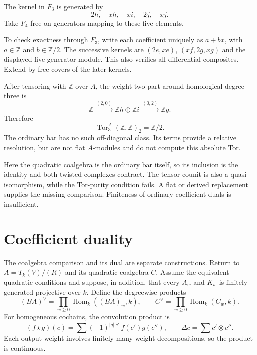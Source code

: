 The kernel in $F_3$ is generated by
\[
 2h,\quad xh,\quad xi,\quad2j,\quad xj.
\]
Take $F_4$ free on generators mapping to these five elements.

To check exactness through $F_3$, write each coefficient uniquely as $a+bx$, with $a\in\mathbb Z$ and $b\in\mathbb Z/2$.
The successive kernels are $(2e,xe)$, $(xf,2g,xg)$ and the displayed five-generator module.
This also verifies all differential composites.
Extend by free covers of the later kernels.

After tensoring with $\mathbb Z$ over $A$, the weight-two part around homological degree three is
\[
 \mathbb Z\xrightarrow{\ (2,0)\ }
 \mathbb Zh\oplus\mathbb Zi
 \xrightarrow{\ (0,2)\ }\mathbb Zg.
\]
Therefore
\[
 \operatorname{Tor}^A_3(\mathbb Z,\mathbb Z)_2=\mathbb Z/2.
\]
The ordinary bar has no such off-diagonal class.
Its terms provide a relative resolution, but are not flat $A$-modules and do not compute this absolute Tor.

Here the quadratic coalgebra is the ordinary bar itself, so its inclusion is the identity and both twisted complexes contract.
The tensor counit is also a quasi-isomorphism, while the Tor-purity condition fails.
A flat or derived replacement supplies the missing comparison.
Finiteness of ordinary coefficient duals is insufficient.

\section{Coefficient duality}
The coalgebra comparison and its dual are separate constructions.
Return to $A=T_k(V)/(R)$ and its quadratic coalgebra $C$.
Assume the equivalent quadratic conditions and suppose, in addition, that every $A_w$ and $K_w$ is finitely generated projective over $k$.
Define the degreewise products
\[
 (BA)^\vee=\prod_{w\geq0}\operatorname{Hom}_k((BA)_w,k),
 \qquad
 C^\vee=\prod_{w\geq0}\operatorname{Hom}_k(C_w,k).
\]
For homogeneous cochains, the convolution product is
\[
 (f\star g)(c)=\sum(-1)^{|g||c'|}f(c')g(c''),
 \qquad \Delta c=\sum c'\otimes c''.
\]
Each output weight involves finitely many weight decompositions, so the product is continuous.

